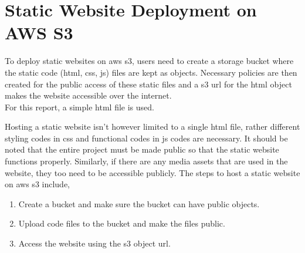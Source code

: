 \documentclass{home_assignment}
\begin{document}
    \section{Static Website Deployment on AWS S3}
    To deploy static websites on \acrshort{aws} \acrshort{s3}, users need to create a storage bucket where the static code (\acrshort{html}, \acrshort{css}, \acrshort{js}) files are kept as objects. Necessary policies are then created for the public access of these static files and a \acrshort{s3} url for the \acrshort{html} object makes the website accessible over the internet.\\
    For this report, a simple \acrshort{html} file is used.
    
    Hosting a static website isn't however limited to a single \acrshort{html} file, rather different styling codes in \acrshort{css} and functional codes in \acrshort{js} codes are necessary. It should be noted that the entire project must be made public so that the static website functions properly. Similarly, if there are any media assets that are used in the website, they too need to be accessible publicly. The steps to host a static website on \acrshort{aws} \acrshort{s3} include,
    \begin{enumerate}
        \item Create a bucket and make sure the bucket can have public objects.
        \item Upload code files to the bucket and make the files public.
        \item Access the website using the \acrshort{s3} object url.
    \end{enumerate}
    
\end{document}
